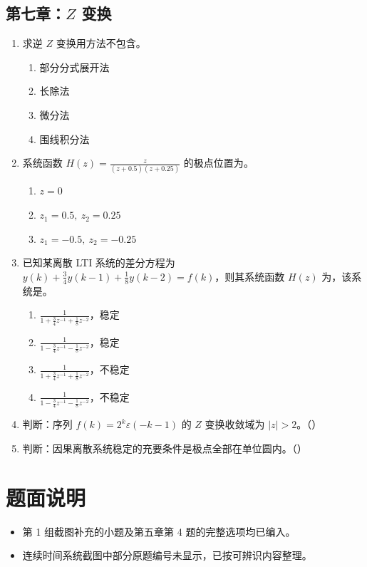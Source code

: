 \documentclass[12pt,a4paper]{ctexart}
\newcommand{\eps}{\varepsilon}
\begin{document}
\subsection{第七章：$Z$ 变换}

\begin{enumerate}[label=\arabic*.]
\item 求逆 $Z$ 变换用方法不包含\underline{\hspace{2cm}}。
\begin{enumerate}[label=\Alph*.]
\item 部分分式展开法
\item 长除法
\item 微分法
\item 围线积分法
\end{enumerate}

\item 系统函数 \(\displaystyle H(z)=\frac{z}{(z+0.5)(z+0.25)}\) 的极点位置为\underline{\hspace{2cm}}。
\begin{enumerate}[label=\Alph*.]
\item $z=0$
\item $z_1=0.5,\ z_2=0.25$
\item $z_1=-0.5,\ z_2=-0.25$
\end{enumerate}

\item 已知某离散 LTI 系统的差分方程为 \(\displaystyle y(k)+\frac34 y(k-1)+\frac18 y(k-2)=f(k)\)，则其系统函数 $H(z)$ 为\underline{\hspace{2cm}}，该系统是\underline{\hspace{2cm}}。
\begin{enumerate}[label=\Alph*.]
\item $\displaystyle \frac{1}{1+\frac34z^{-1}+\frac18z^{-2}}$，稳定
\item $\displaystyle \frac{1}{1-\frac34z^{-1}-\frac18z^{-2}}$，稳定
\item $\displaystyle \frac{1}{1+\frac34z^{-1}+\frac18z^{-2}}$，不稳定
\item $\displaystyle \frac{1}{1-\frac34z^{-1}-\frac18z^{-2}}$，不稳定
\end{enumerate}

\item 判断：序列 \(\displaystyle f(k)=2^k\eps(-k-1)\) 的 $Z$ 变换收敛域为 $|z|>2$。（\qquad）

\item 判断：因果离散系统稳定的充要条件是极点全部在单位圆内。\quad（\qquad）
\end{enumerate}

\section*{题面说明}
\begin{itemize}
\item 第 1 组截图补充的小题及第五章第 4 题的完整选项均已编入。
\item 连续时间系统截图中部分原题编号未显示，已按可辨识内容整理。
\end{itemize}
\end{document}
